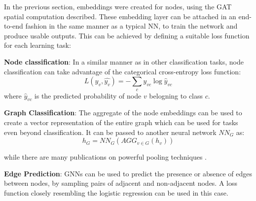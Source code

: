 In the previous section, embeddings were created for nodes, using the
GAT spatial computation described. These embedding layer can be attached
in an end-to-end fashion in the same manner as a typical NN, to train the
network and produce usable outputs. This can be achieved by defining a suitable
loss function for each learning task:

\textbf{Node classification}: In a similar manner as in other classification
tasks, node classification can take advantage of the categorical cross-entropy loss
function:
\begin{equation}
  \label{eq:categoricalCE}
  L(y_v,\hat{y_v}) = - \sum_c y_{vc} \log\hat{y}_{vc}
\end{equation}
where $\hat{y}_{vc}$ is the predicted probability of node $v$ belogning to class $c$.

\textbf{Graph Classification}: The aggregate of the node embeddings can be
used to create a vector representation of the entire graph which can be used
for tasks even beyond classification. It can be passed to another neural
network $NN_G$ as:
\begin{equation*}
  h_G = NN_G(AGG_{v\in G}({h_v}))
\end{equation*}

while there are many publications on powerful pooling techniques \cite{zhang2018end,ying2018hierarchical,lee2019self}.

\textbf{Edge Prediction}: GNNs can be used to predict the presence or absence of
edges between nodes, by sampling pairs of adjacent and non-adjacent nodes. A loss
function closely resembling the logistic regression can be used in this case.
